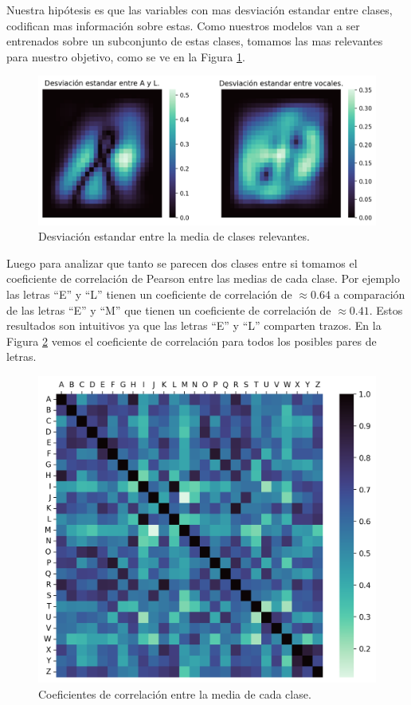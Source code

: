 \documentclass[11pt,a4paper, twocolumn]{article}
\begin{document}
Nuestra hipótesis es que las variables con mas desviación estandar entre clases, codifican mas información sobre estas. Como nuestros modelos van a ser entrenados sobre un subconjunto de estas clases, tomamos las mas relevantes para nuestro objetivo, como se ve en la Figura \ref{fig:3a}.

\begin{figure}[H]
	\centering
	\includegraphics[scale=0.7]{figuras/3a.png}
	\caption{Desviación estandar entre la media de clases relevantes.}
	\label{fig:3a}
\end{figure}

Luego para analizar que tanto se parecen dos clases entre si tomamos el coeficiente de correlación de Pearson entre las medias de cada clase. Por ejemplo las letras ``E'' y ``L'' tienen un coeficiente de correlación de $\approx 0.64$ a comparación de las letras ``E'' y ``M'' que tienen un coeficiente de correlación de $\approx 0.41$. Estos resultados son intuitivos ya que las letras ``E'' y ``L'' comparten trazos. En la Figura \ref{fig:4a} vemos el coeficiente de correlación para todos los posibles pares de letras.

\begin{figure}[H]
	\centering
	\includegraphics[scale=0.6]{figuras/4a.png}
	\caption{Coeficientes de correlación entre la media de cada clase.}
	\label{fig:4a}
\end{figure}
\end{document}
